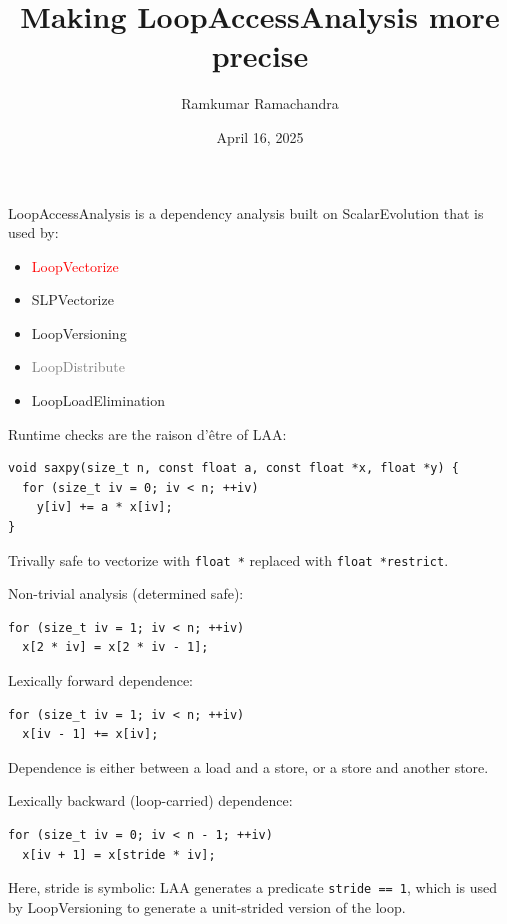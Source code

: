 \documentclass{beamer}
\title{Making LoopAccessAnalysis more precise}
\author{Ramkumar Ramachandra}
\institute{Codasip}
\date{April 16, 2025}
\begin{document}
\begin{frame}
  \titlepage
\end{frame}
\begin{frame}
  LoopAccessAnalysis is a dependency analysis built on ScalarEvolution that is used by:
  \begin{itemize}
    \item \textcolor{red}{LoopVectorize}
    \item SLPVectorize
    \item LoopVersioning
    \item \textcolor{gray}{LoopDistribute}
    \item LoopLoadElimination
  \end{itemize}
\end{frame}

\begin{frame}[containsverbatim]
  Runtime checks are the raison d'être of LAA:
  \begin{verbatim}
void saxpy(size_t n, const float a, const float *x, float *y) {
  for (size_t iv = 0; iv < n; ++iv)
    y[iv] += a * x[iv];
}
  \end{verbatim}

  \vspace{1em}

  Trivally safe to vectorize with \texttt{float *} replaced with \texttt{float *restrict}.

  \vspace{1em}

  Non-trivial analysis (determined safe):
  \begin{verbatim}
for (size_t iv = 1; iv < n; ++iv)
  x[2 * iv] = x[2 * iv - 1];
  \end{verbatim}
\end{frame}

\begin{frame}[containsverbatim]
  Lexically forward dependence:
  \begin{verbatim}
for (size_t iv = 1; iv < n; ++iv)
  x[iv - 1] += x[iv];
  \end{verbatim}

  \vspace{1em}

  Dependence is either between a load and a store, or a store and another store.

  \vspace{1em}

  Lexically backward (loop-carried) dependence:
  \begin{verbatim}
for (size_t iv = 0; iv < n - 1; ++iv)
  x[iv + 1] = x[stride * iv];
  \end{verbatim}

  \vspace{1em}

  Here, stride is symbolic: LAA generates a predicate \texttt{stride == 1}, which is used by LoopVersioning to generate a unit-strided version of the loop.
\end{frame}
\end{document}
